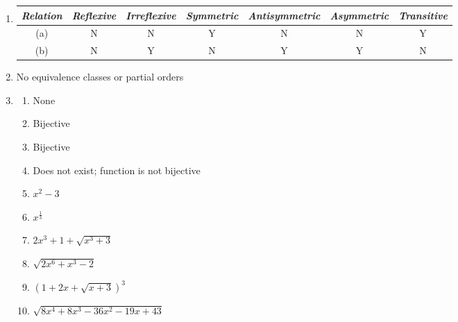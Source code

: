 \begin{enumerate}[leftmargin=2cm,labelsep=.5cm,label=\bf\arabic*.]
\item
\begin{tabu}[t]{|c|c|c|c|c|c|c|}
\hline
\textit{Relation} & \textit{Reflexive} & \textit{Irreflexive} & \textit{Symmetric} & \textit{Antisymmetric} & \textit{Asymmetric} & \textit{Transitive} \\ \hline
(a) & N & N & Y & N & N & Y \\ \hline
(b) & N & Y & N & Y & Y & N \\ \hline
\end{tabu}

\item No equivalence classes or partial orders

\item
\begin{enumerate}
\item None
\item Bijective
\item Bijective
\item Does not exist; function is not bijective
\item $x^2-3$
\item $x^{\frac{1}{3}}$
\item $2x^3+1+\sqrt{x^3+3}$
\item $\sqrt{2x^6+x^3-2}$
\item $\left(1+2x+\sqrt{x+3}\right)^3$
\item $\sqrt{8x^4+8x^3-36x^2-19x+43}$
\end{enumerate}
\end{enumerate}
